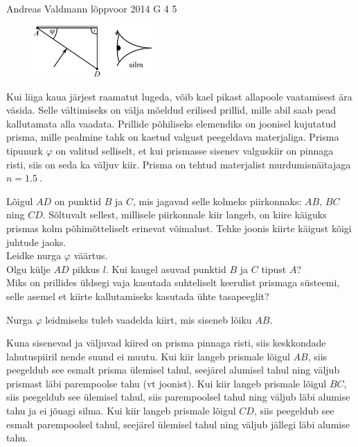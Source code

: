 {Andreas Valdmann} %
{lõppvoor} %
{2014} %
{G 4} %
{5} %
{
\ifStatement
\begin{figure}
 \begin{center}
 \includegraphics[width=0.4\textwidth]{2014-v3g-04-periskoopprillid_yl_joonis.pdf}
 \end{center}
\end{figure}

Kui liiga kaua järjest raamatut lugeda, võib kael pikast allapoole vaatamisest ära väsida. Selle vältimiseks on välja mõeldud erilised prillid, mille abil saab pead kallutamata alla vaadata. Prillide põhiliseks elemendiks on joonisel kujutatud prisma, mille pealmine tahk on kaetud valgust peegeldava materjaliga. Prisma tipunurk $\varphi$ on valitud selliselt, et kui prismasse sisenev valguskiir on pinnaga risti, siis on seda ka väljuv kiir. Prisma on tehtud materjalist murdumisnäitajaga $n=\SI{1,5}{}$. 

\osa Lõigul $AD$ on punktid $B$ ja $C$, mis jagavad selle kolmeks piirkonnaks: $AB$, $BC$ ning $CD$. Sõltuvalt sellest, millisele piirkonnale kiir langeb, on kiire käiguks prismas kolm põhimõtteliselt erinevat võimalust. Tehke joonis kiirte käigust kõigi juhtude jaoks.\\
\osa Leidke nurga $\varphi$ väärtus.\\
\osa Olgu külje $AD$ pikkus $l$. Kui kaugel asuvad punktid $B$ ja $C$ tipust $A$?\\
\osa Miks on prillides üldsegi vaja kasutada suhteliselt keerulist prismaga süsteemi, selle asemel et kiirte kallutamiseks kasutada ühte tasapeeglit?
\fi


\ifHint
Nurga $\varphi$ leidmiseks tuleb vaadelda kiirt, mis siseneb lõiku $AB$.
\fi


\ifSolution
\osa Kuna sisenevad ja väljuvad kiired on prisma pinnaga risti, siis keskkondade lahutuspiiril nende suund ei muutu. Kui kiir langeb prismale lõigul $AB$, siis peegeldub see esmalt prisma ülemisel tahul, seejärel alumisel tahul ning väljub prismast läbi parempoolse tahu (vt joonist). Kui kiir langeb prismale lõigul $BC$, siis peegeldub see ülemisel tahul, siis parempoolsel tahul ning väljub läbi alumise tahu ja ei jõuagi silma. Kui kiir langeb prismale lõigul $CD$, siis peegeldub see esmalt parempoolsel tahul, seejärel ülemisel tahul ning väljub jällegi läbi alumise tahu.

}
